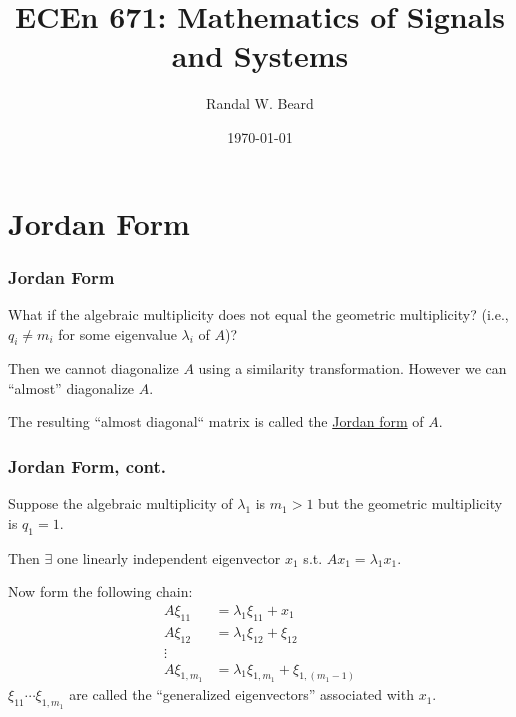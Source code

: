 \documentclass{beamer}
\title{ECEn 671: Mathematics of Signals and Systems}
\author{Randal W. Beard}
\institute{Brigham Young University}
\date{\today}
\begin{document}
\begin{frame}
	\titlepage
\end{frame}


\section{Jordan Form}
\frame{\sectionpage}	

\begin{frame}\frametitle{Jordan Form}
	What if the algebraic multiplicity does not equal the geometric
	multiplicity? (i.e., $q_i \neq m_i$ for some eigenvalue $\lambda_i$ of $A$)?
	
	\vfill
	
	Then we cannot diagonalize $A$ using a similarity transformation.
	However we can ``almost'' diagonalize $A$.
	
	\vfill
	
	The resulting ``almost diagonal`` matrix is called the \underline{Jordan form} of $A$.	
\end{frame}

\begin{frame}\frametitle{Jordan Form, cont.}
	
	Suppose the algebraic multiplicity of $\lambda_1$ is $m_1 > 1$ but the
	geometric multiplicity is $q_1 = 1$.
	
	\vfill
	
	Then $\exists$ one linearly independent eigenvector $x_1$ s.t. $Ax_1 = \lambda_1 x_1$.
	
	\vfill
	
	Now form the following chain:
	\begin{align*}
		A\xi_{11} &= \lambda_1 \xi_{11} + x_1\\
		A\xi_{12} &= \lambda_1 \xi_{12} + \xi_{12}\\
		\vdots\\
		A \xi_{1,m_1} &= \lambda_1 \xi_{1,m_1} + \xi_{1,({m_1}-1)}
	\end{align*}
	$\xi_{11} \cdots \xi_{1,m_1}$ are called the ``generalized eigenvectors'' associated with $x_1$.	
\end{frame}
\end{document}
